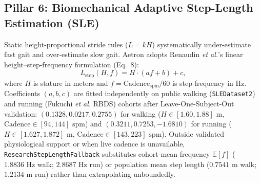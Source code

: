 \documentclass[journal]{IEEEtran}
\begin{document}
\subsection{Pillar 6: Biomechanical Adaptive Step-Length Estimation (SLE)}
Static height-proportional stride rules ($L = k H$) systematically under-estimate fast gait and over-estimate slow gait. Aetron adopts Renaudin \emph{et al.}'s linear height--step-frequency formulation \cite{renaudin2012step} (Eq.~8):
\begin{equation}
  L_{\text{step}}(H, f) = H \cdot (a f + b) + c,
  \label{eq:renaudin}
\end{equation}
where $H$ is stature in meters and $f = \mathrm{Cadence}_{\text{spm}}/60$ is step frequency in Hz. Coefficients $(a, b, c)$ are fitted independently on public walking (\texttt{SLEDataset2}) and running (Fukuchi \emph{et al.} \cite{fukuchi2017public} RBDS) cohorts after Leave-One-Subject-Out validation: $(0.1328, 0.0217, 0.2755)$ for walking ($H \in [1.60, 1.88]\text{ m}$, $\mathrm{Cadence} \in [94, 144]\text{ spm}$) and $(0.3211, 0.7253, -1.6810)$ for running ($H \in [1.627, 1.872]\text{ m}$, $\mathrm{Cadence} \in [143, 223]\text{ spm}$). Outside validated physiological support or when live cadence is unavailable, \texttt{ResearchStepLengthFallback} substitutes cohort-mean frequency $\mathbb{E}[f]$ ($1.8836\text{ Hz}$ walk; $2.8687\text{ Hz}$ run) or population mean step length ($0.7541\text{ m}$ walk; $1.2134\text{ m}$ run) rather than extrapolating unboundedly.
\end{document}
